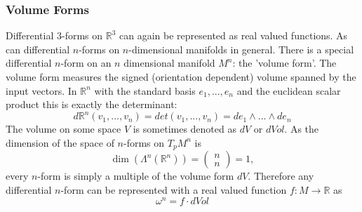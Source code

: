 \subsubsection*{Volume Forms}
Differential $3$-forms on $\mathbb R^3$ can again be represented as real valued functions. As can differential $n$-forms on $n$-dimensional manifolds in general.
There is a special differential $n$-form on an $n$ dimensional manifold $M^n$: the 'volume form'. The volume form measures the signed (orientation dependent) volume spanned by the input vectors. In $\mathbb R^n$ with the standard basis $e_1,...,e_n$ and the euclidean scalar product this is exactly the determinant:
\[d\mathbb R^n (v_1,..., v_n) = det(v_1,...,v_n) = de_1\wedge ...\wedge d e_n\]
The volume on some space $V$ is sometimes denoted as $dV$ or $dVol$.
 As the dimension of the space of $n$-forms on $T_pM^n$ is
\[\dim(\Lambda^n(\mathbb R^n)) = \begin{pmatrix}
	n\\n
\end{pmatrix}= 1,\]
every $n$-form is simply a multiple of the volume form $dV$. Therefore any differential $n$-form can be represented with a real valued function $f:M \rightarrow \mathbb R$ as
\[\omega^n = f \cdot dVol\]


